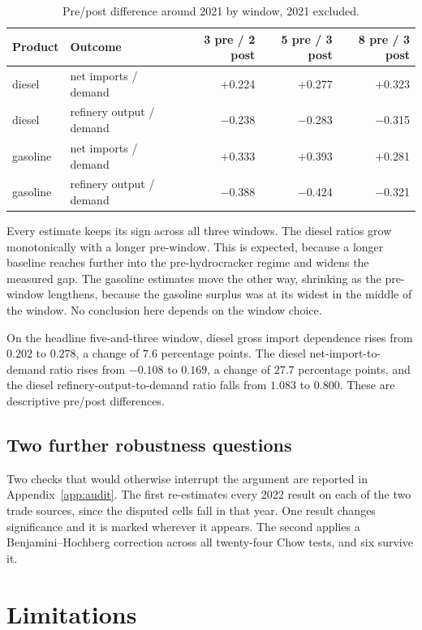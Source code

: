\documentclass[11pt,a4paper]{article}
\begin{document}
\begin{table}[htbp]
\centering
\caption{Pre/post difference around 2021 by window, 2021 excluded.}
\label{tab:windows}
\begin{tabular}{llrrr}
\toprule
Product & Outcome & 3 pre / 2 post & 5 pre / 3 post & 8 pre / 3 post \\
\midrule
diesel & net imports / demand & $+$0.224 & $+$0.277 & $+$0.323 \\
diesel & refinery output / demand & $-$0.238 & $-$0.283 & $-$0.315 \\
gasoline & net imports / demand & $+$0.333 & $+$0.393 & $+$0.281 \\
gasoline & refinery output / demand & $-$0.388 & $-$0.424 & $-$0.321 \\
\bottomrule
\end{tabular}
\end{table}

Every estimate keeps its sign across all three windows. The diesel ratios grow monotonically
with a longer pre-window. This is expected, because a longer baseline reaches further into the
pre-hydrocracker regime and widens the measured gap. The gasoline estimates move the other way,
shrinking as the pre-window lengthens, because the gasoline surplus was at its widest in the
middle of the window. No conclusion here depends on the window choice.

On the headline five-and-three window, diesel gross import dependence rises from $0.202$ to
$0.278$, a change of $7.6$ percentage points. The diesel net-import-to-demand ratio rises from
$-0.108$ to $0.169$, a change of $27.7$ percentage points, and the diesel refinery-output-to-demand
ratio falls from $1.083$ to $0.800$. These are descriptive pre/post differences.

\subsection{Two further robustness questions}

Two checks that would otherwise interrupt the argument are reported in
Appendix~\ref{app:audit}. The first re-estimates every 2022 result on each of the two trade
sources, since the disputed cells fall in that year. One result changes significance and it is
marked wherever it appears. The second applies a Benjamini--Hochberg correction across all
twenty-four Chow tests, and six survive it.

\section{Limitations}
\end{document}
